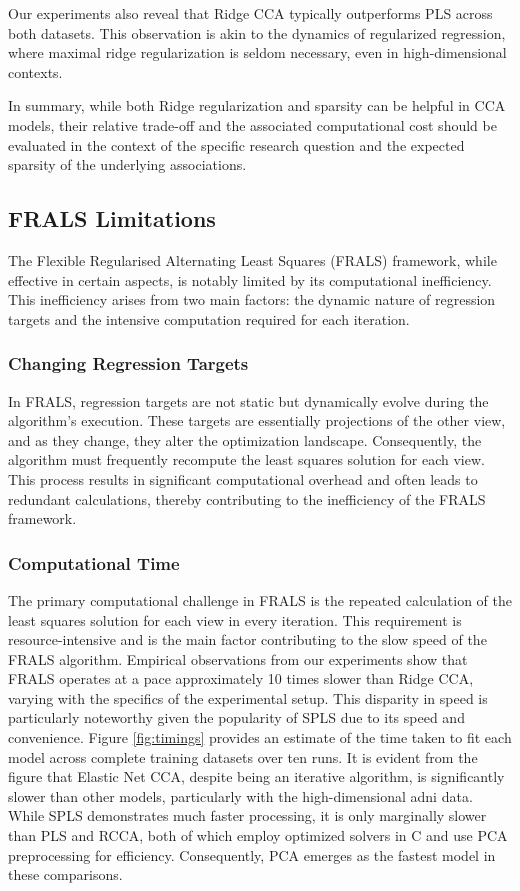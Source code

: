 Our experiments also reveal that Ridge CCA typically outperforms PLS across both datasets. This observation is akin to the dynamics of regularized regression, where maximal ridge regularization is seldom necessary, even in high-dimensional contexts.

In summary, while both Ridge regularization and sparsity can be helpful in CCA models, their relative trade-off and the associated computational cost should be evaluated in the context of the specific research question and the expected sparsity of the underlying associations.

\subsection{FRALS Limitations}

The Flexible Regularised Alternating Least Squares (FRALS) framework, while effective in certain aspects, is notably limited by its computational inefficiency. This inefficiency arises from two main factors: the dynamic nature of regression targets and the intensive computation required for each iteration.

\subsubsection{Changing Regression Targets}

In FRALS, regression targets are not static but dynamically evolve during the algorithm's execution. These targets are essentially projections of the other view, and as they change, they alter the optimization landscape. Consequently, the algorithm must frequently recompute the least squares solution for each view. This process results in significant computational overhead and often leads to redundant calculations, thereby contributing to the inefficiency of the FRALS framework.

\subsubsection{Computational Time}

The primary computational challenge in FRALS is the repeated calculation of the least squares solution for each view in every iteration. This requirement is resource-intensive and is the main factor contributing to the slow speed of the FRALS algorithm. Empirical observations from our experiments show that FRALS operates at a pace approximately 10 times slower than Ridge CCA, varying with the specifics of the experimental setup. This disparity in speed is particularly noteworthy given the popularity of SPLS due to its speed and convenience. Figure \ref{fig:timings} provides an estimate of the time taken to fit each model across complete training datasets over ten runs. It is evident from the figure that Elastic Net CCA, despite being an iterative algorithm, is significantly slower than other models, particularly with the high-dimensional \acrshort{adni} data. While SPLS demonstrates much faster processing, it is only marginally slower than PLS and RCCA, both of which employ optimized solvers in C and use PCA preprocessing for efficiency. Consequently, PCA emerges as the fastest model in these comparisons.

